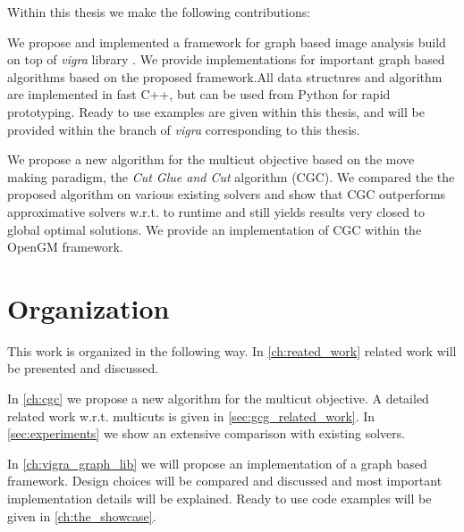 Within this thesis we make the following contributions:

\begin{compactitem}
    \item We propose and implemented a framework for graph based image analysis 
        build on top of  \emph{vigra} library \cite{software_vigra}. We provide implementations for important graph based algorithms based on the proposed framework.All data structures and algorithm are implemented in fast C++, 
        but can be used from Python for rapid prototyping.
        Ready to use examples are given within this thesis, and will be 
        provided within the branch of \emph{vigra} corresponding to 
        this thesis.



    \item 
        We propose a new algorithm for the multicut objective based on the move
        making paradigm, the \emph{Cut Glue and Cut} algorithm (CGC). We compared the 
        the proposed algorithm on various existing solvers and show
        that CGC outperforms approximative solvers w.r.t. to runtime and still yields
        results very closed to global optimal solutions. We provide an implementation of CGC within the OpenGM framework.



\end{compactitem}


\section{Organization}

This work is organized in the following way.
In \cref{ch:reated_work} related work will be presented and  discussed.



In \cref{ch:cgc} we propose a new algorithm for the multicut objective.
A detailed related work w.r.t. multicuts is given in \cref{sec:gcg_related_work}.
In \cref{sec:experiments} we show an extensive comparison  with existing solvers.



In \cref{ch:vigra_graph_lib} we will propose an implementation of
a graph based framework. 
Design choices will be compared and discussed and most 
important implementation details will be explained.
Ready to use code examples will be given in \cref{ch:the_showcase}.




